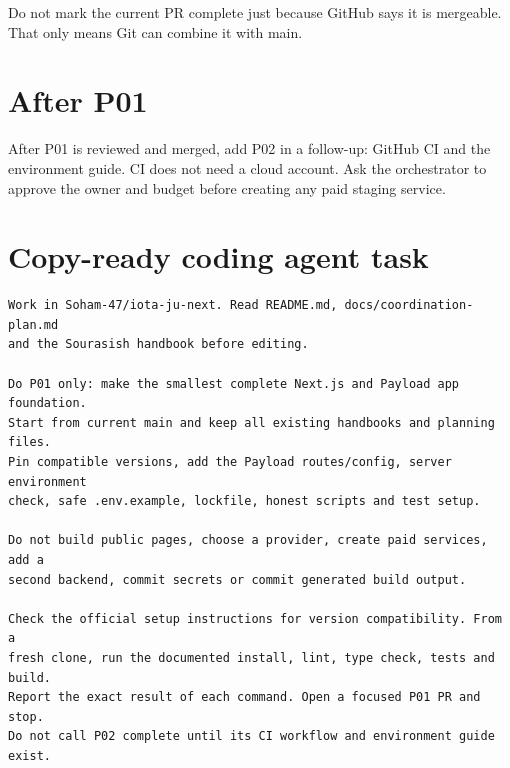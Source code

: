 \documentclass[11pt]{article}
\begin{document}
Do not mark the current PR complete just because GitHub says it is mergeable. That only means Git can combine it with main.

\section{After P01}

After P01 is reviewed and merged, add P02 in a follow-up: GitHub CI and the environment guide. CI does not need a cloud account. Ask the orchestrator to approve the owner and budget before creating any paid staging service.

\section{Copy-ready coding agent task}

\begin{verbatim}
Work in Soham-47/iota-ju-next. Read README.md, docs/coordination-plan.md
and the Sourasish handbook before editing.

Do P01 only: make the smallest complete Next.js and Payload app foundation.
Start from current main and keep all existing handbooks and planning files.
Pin compatible versions, add the Payload routes/config, server environment
check, safe .env.example, lockfile, honest scripts and test setup.

Do not build public pages, choose a provider, create paid services, add a
second backend, commit secrets or commit generated build output.

Check the official setup instructions for version compatibility. From a
fresh clone, run the documented install, lint, type check, tests and build.
Report the exact result of each command. Open a focused P01 PR and stop.
Do not call P02 complete until its CI workflow and environment guide exist.
\end{verbatim}
\end{document}
